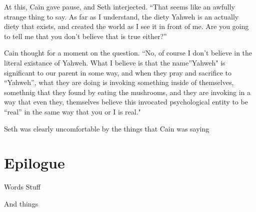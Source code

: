 \documentclass[12pt,twoside,titlepage]{report}
\begin{document}
At this, Cain gave pause, and Seth interjected. ``That seems like an
awfully strange thing to say. As far as I understand, the diety Yahweh
is an actually diety that exists, and created the world as I see it in
front of me. Are you going to tell me that you don't believe that is
true either?''

Cain thought for a moment on the question. ``No, of course I don't
believe in the literal existance of Yahweh. What I believe is that the
name''Yahweh" is significant to our parent in some way, and when they
pray and sacrifice to ``Yahweh'', what they are doing is invoking
something inside of themselves, somethnig that they found by eating the
mushrooms, and they are invoking in a way that even they, themselves
believe this invocated psychological entity to be ``real'' in the same
way that you or I is real."

Seth was clearly uncomfortable by the things that Cain was saying

\hypertarget{epilogue}{%
\chapter{Epilogue}\label{epilogue}}

Words Stuff

And things
\end{document}
